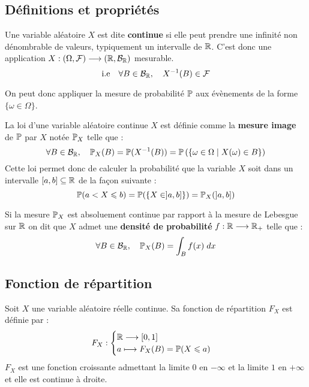 \subsection{Définitions et propriétés}

\begin{definition}
    Une variable aléatoire $X$ est dite \textbf{continue} si elle peut prendre une infinité non dénombrable de valeurs, typiquement un intervalle de $\mathbb{R}$. 
    C'est donc une application $X : (\Omega, \mathcal{F}) \longrightarrow (\mathbb{R}, \mathcal{B}_{\mathbb{R}})$ mesurable. 
        \[ \text{i.e} \quad \forall B \in \mathcal{B}_{\mathbb{R}}, \quad X^{-1}(B) \in \mathcal{F} \] 
\end{definition}

On peut donc appliquer la mesure de probabilité $\mathbb{P}$ aux évènements de la forme $\{\omega \in \Omega\}$. 

\begin{definition}
    La loi d'une variable aléatoire continue $X$ est définie comme la \textbf{mesure image} de $ \mathbb{P}$ par $X$ notée 
    $ \mathbb{P}_X$ telle que : 
        \[ \forall B \in \mathcal{B}_{\mathbb{R}}, \quad \mathbb{P}_X(B) = \mathbb{P}(X^{-1}(B)) = \mathbb{P} \left( \{\omega \in \Omega \; | \; X(\omega) \in B\} \right) \] 
    Cette loi permet donc de calculer la probabilité que la variable $X$ soit dans un intervalle $[a,b] \subseteq \mathbb{R}$ 
    de la façon suivante : 
        \[ \mathbb{P}(a < X \leqslant b) = \mathbb{P}(\{X \in ]a,b]\}) = \mathbb{P}_X(]a,b]) \]  
\end{definition}

\begin{definition}
    Si la mesure $\mathbb{P}_X$ est absoluement continue par rapport à la mesure de Lebesgue sur $\mathbb{R}$ on dit 
    que $X$ admet une \textbf{densité de probabilité} $ f : \mathbb{R} \longrightarrow \mathbb{R}_+ $ telle que : 
        \[ \forall B \in \mathcal{B}_{\mathbb{R}}, \quad \mathbb{P}_X(B) = \int_B f(x) \; dx \] 
\end{definition}


\subsection{Fonction de répartition}

\begin{definition}
    Soit $X$ une variable aléatoire réelle continue. Sa {fonction de répartition} $F_X$ est définie par :
    \[ F_X : 
        \begin{cases}
            \mathbb{R} \longrightarrow [0,1] \\ 
            a \longmapsto F_X(B) = \mathbb{P}(X \leqslant a)
        \end{cases} \]
    $F_X$ est une fonction croissante admettant la limite $0$ en $- \infty$ et la 
    limite $1$ en $+ \infty$ et elle est continue à droite. 
\end{definition}

